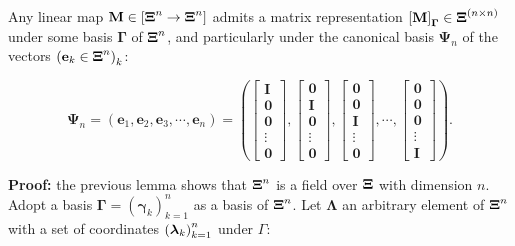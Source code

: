 \begin{theorem} \label{theo:dpf_matrices_exist} %
	Any linear map $\mathbf{M}\in\left[\boldsymbol{\Xi}^n\to\boldsymbol{\Xi}^n\right]$ admits a matrix representation $\left[\mathbf{M}\right]_{\boldsymbol{\Gamma}}\in\boldsymbol{\Xi}^{(n\times n)}$ under some basis $\boldsymbol{\Gamma}$ of $\boldsymbol{\Xi}^n$, and particularly under the canonical basis $\boldsymbol{\Psi}_n$ of the vectors $\left(\mathbf{e}_k\in\boldsymbol{\Xi}^n\right)_k$:

\begin{equation} \boldsymbol{\Psi}_n = \left(\mathbf{e}_1,\mathbf{e}_2,\mathbf{e}_3, \cdots ,\mathbf{e}_n\right) = \left(\left[\begin{array}{c} \mathbf{I} \\[3mm] \mathbf{0} \\[3mm] \mathbf{0} \\[3mm] \vdots \\[3mm] \mathbf{0} \end{array}\right], \left[\begin{array}{c} \mathbf{0} \\[3mm] \mathbf{I} \\[3mm] \mathbf{0} \\[3mm] \vdots \\[3mm] \mathbf{0} \end{array}\right], \left[\begin{array}{c} \mathbf{0} \\[3mm] \mathbf{0} \\[3mm] \mathbf{I} \\[3mm] \vdots \\[3mm] \mathbf{0} \end{array}\right], \cdots , \left[\begin{array}{c} \mathbf{0} \\[3mm] \mathbf{0} \\[3mm] \mathbf{0} \\[3mm] \vdots \\[3mm] \mathbf{I} \end{array}\right]\right) . \label{eq:dpf_canonical_basis}\end{equation}
\end{theorem}
\noindent\textbf{Proof:} the previous lemma shows that $\boldsymbol{\Xi}^n$ is a field over $\boldsymbol{\Xi}$ with dimension $n$. Adopt a basis $\boldsymbol{\Gamma} = \left(\boldsymbol{\gamma}_k\right)_{k=1}^n$ as a basis of $\boldsymbol{\Xi}^n$. Let $\boldsymbol{\Lambda}$ an arbitrary element of $\boldsymbol{\Xi}^n$ with a set of coordinates $\left(\boldsymbol{\lambda}_k\right)_{k=1}^n$ under $\Gamma$:

